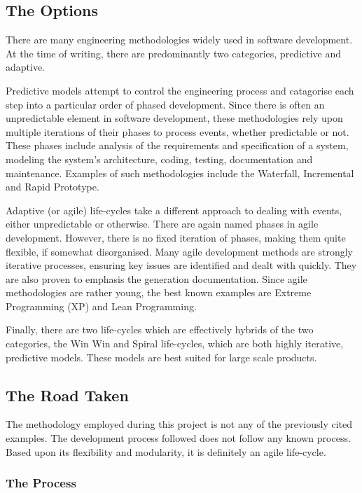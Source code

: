
\subsection{The Options}

There are many engineering methodologies widely used in software
development. At the time of writing, there are predominantly two
categories, predictive and adaptive.


Predictive models attempt to control the engineering process and
catagorise each step into a particular order of phased development. 
Since there is often an unpredictable element in software development, 
these methodologies rely upon multiple iterations of their phases to 
process events, whether predictable or not. These phases include 
analysis of the requirements and specification of a system, modeling 
the system's architecture, coding, testing, documentation and 
maintenance. Examples of such methodologies include the Waterfall, 
Incremental and Rapid Prototype.


Adaptive (or agile) life-cycles take a different approach to dealing 
with events, either unpredictable or otherwise. There are again named 
phases in agile development. However, there is no fixed iteration of 
phases, making them quite flexible, if somewhat disorganised. Many 
agile development methods are strongly iterative processes, ensuring key 
issues are identified and dealt with quickly. They are also proven to
emphasis the generation documentation. Since agile methodologies are 
rather young, the best known examples are Extreme Programming (XP) and 
Lean Programming.


Finally, there are two life-cycles which are effectively hybrids of the
two categories, the Win Win and Spiral life-cycles, which are both highly
iterative, predictive models. These models are best suited for large
scale products.

\subsection{The Road Taken}

The methodology employed during this project is not any of the
previously cited examples. The development process followed does not 
follow any known process. Based upon its flexibility and modularity, 
it is definitely an agile life-cycle.

\subsubsection{The Process}

